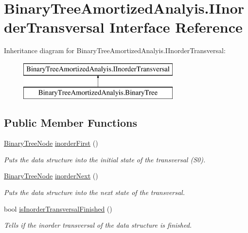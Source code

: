 \hypertarget{interface_binary_tree_amortized_analyis_1_1_i_inorder_transversal}{}\section{Binary\+Tree\+Amortized\+Analyis.\+I\+Inorder\+Transversal Interface Reference}
\label{interface_binary_tree_amortized_analyis_1_1_i_inorder_transversal}
Inheritance diagram for Binary\+Tree\+Amortized\+Analyis.\+I\+Inorder\+Transversal\+:\begin{figure}[H]
\begin{center}
\leavevmode
\includegraphics[height=2.000000cm]{interface_binary_tree_amortized_analyis_1_1_i_inorder_transversal}
\end{center}
\end{figure}
\subsection*{Public Member Functions}
\begin{DoxyCompactItemize}
\item 
\hyperlink{class_binary_tree_amortized_analyis_1_1_binary_tree_node}{Binary\+Tree\+Node} \hyperlink{interface_binary_tree_amortized_analyis_1_1_i_inorder_transversal_a6e1092e20929796c8d7911610a804744}{inorder\+First} ()
\begin{DoxyCompactList}\small\item\em Puts the data structure into the initial state of the transversal (S0). \end{DoxyCompactList}\item 
\hyperlink{class_binary_tree_amortized_analyis_1_1_binary_tree_node}{Binary\+Tree\+Node} \hyperlink{interface_binary_tree_amortized_analyis_1_1_i_inorder_transversal_aefa8dc996d673a6439cd040359135cfb}{inorder\+Next} ()
\begin{DoxyCompactList}\small\item\em Puts the data structure into the next state of the transversal. \end{DoxyCompactList}\item 
bool \hyperlink{interface_binary_tree_amortized_analyis_1_1_i_inorder_transversal_a8a169c9c426b9f37613f44e7997ae329}{is\+Inorder\+Transversal\+Finished} ()
\begin{DoxyCompactList}\small\item\em Tells if the inorder transversal of the data structure is finished. \end{DoxyCompactList}\end{DoxyCompactItemize}


